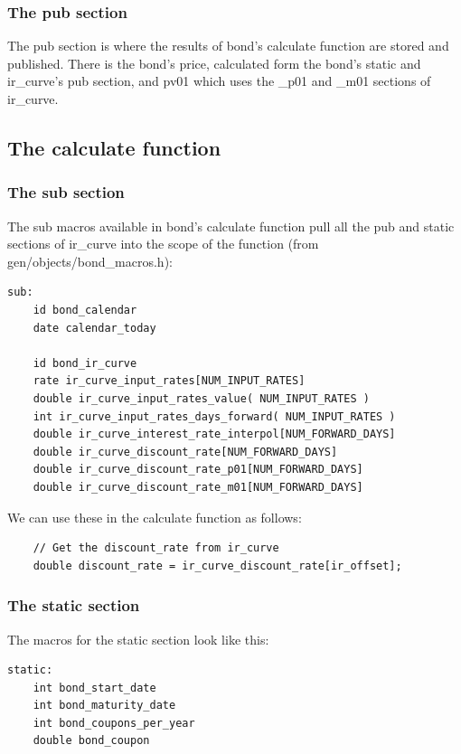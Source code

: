 \documentclass{report}
\begin{document}
\subsubsection{The pub section}

The pub section is where the results of bond's calculate function are stored and published. There is the bond's price, calculated form the bond's static and ir_curve's pub section, and pv01 which uses the _p01 and _m01 sections of ir_curve.

\subsection{The calculate function}

\subsubsection{The sub section}

The sub macros available in bond's calculate function pull all the pub and static sections of ir_curve into the scope of the function (from gen/objects/bond_macros.h):

\begin{verbatim}
sub:
    id bond_calendar
    date calendar_today

    id bond_ir_curve
    rate ir_curve_input_rates[NUM_INPUT_RATES]
    double ir_curve_input_rates_value( NUM_INPUT_RATES )
    int ir_curve_input_rates_days_forward( NUM_INPUT_RATES )
    double ir_curve_interest_rate_interpol[NUM_FORWARD_DAYS]
    double ir_curve_discount_rate[NUM_FORWARD_DAYS]
    double ir_curve_discount_rate_p01[NUM_FORWARD_DAYS]
    double ir_curve_discount_rate_m01[NUM_FORWARD_DAYS]
\end{verbatim}

We can use these in the calculate function as follows:

\begin{verbatim}
    // Get the discount_rate from ir_curve
    double discount_rate = ir_curve_discount_rate[ir_offset];
\end{verbatim}

\subsubsection{The static section}

The macros for the static section look like this:


\begin{verbatim}
static:
    int bond_start_date
    int bond_maturity_date
    int bond_coupons_per_year
    double bond_coupon
\end{verbatim}
\end{document}
